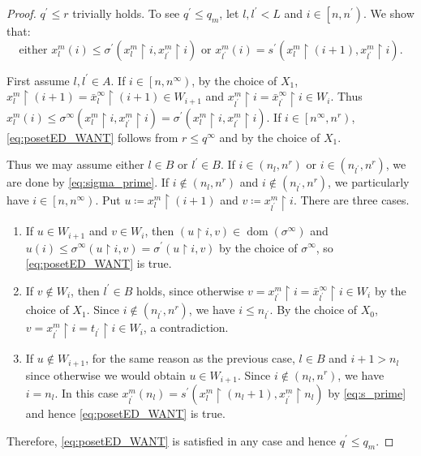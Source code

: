 \documentclass[a4paper,12pt]{amsart}
\theoremstyle{definition}
\numberwithin{thm}{section}
\numberwithin{equation}{section}
\newcommand{\on}{\mathpunct{\upharpoonright}}
\DeclareMathOperator{\dom}{dom}
\begin{document}
\begin{proof}
    	$q^\prime\leq r$ trivially holds.
    	To see $q^\prime\leq q_m$, let $l,l^\prime<L $ and $ i\in\left[n, n^\prime\right)$. 
    	We show that:
        \begin{equation}
            \label{eq:posetED_WANT}
            \text{either }x^m_l(i)\leq\sigma^\prime(x^m_l\on i, x^m_{l^\prime}\on i)\text{ or }
            x^m_{l^\prime}(i)= s^\prime(x^m_l\on(i+1),x^m_{l^\prime}\on i).
        \end{equation}
        
    	First assume $l,l^\prime\in A$. If $ i\in\left[n, n^\infty\right)$, by the choice of $X_1$, $x^m_l\on (i+1)=\bar{x}^\infty_l\on (i+1)\in W_{i+1}$ and $x^m _{l^\prime}\on  i=\bar{x}^\infty_{l^\prime}\on  i\in W_i$. Thus $x^m_l(i)\leq\sigma^\infty(x^m_l\on i, x^m_{l^\prime}\on i)=\sigma^\prime(x^m_l\on i, x^m_{l^\prime}\on i)$. If $ i\in\left[n^\infty, n^r\right)$, \eqref{eq:posetED_WANT} follows from $r\leq q^\infty$ and by the choice of $X_1$.
    
        Thus we may assume either $l\in B$ or $l^\prime\in B$. If $i\in\left(n_l,n^r\right)$ or $i\in\left(n_{l^\prime},n^r\right)$, we are done by \eqref{eq:sigma_prime}. 
    	If $i\notin\left(n_l,n^r\right)$ and $i\notin\left(n_{l^\prime},n^r\right)$, we particularly have $i\in \left[n, n^\infty\right)$.
    	Put $u\coloneqq x^m_l \on (i+1)$ and $v\coloneqq x^m_{l^\prime} \on i$. There are three cases.
        \begin{enumerate}[label = (\roman*)]
            \item
            If $u\in W_{i+1}$ and $v\in W_i$, then $(u\on i,v)\in\dom(\sigma^\infty)$ and $u(i)\leq\sigma^\infty(u\on i, v)=\sigma^\prime(u\on i, v)$ by the choice of $\sigma^\infty$, so \eqref{eq:posetED_WANT} is true.
    
            \item
            If $v\notin W_i$, then $l^\prime\in B$ holds, since otherwise $v=x^m _{l^\prime}\on  i=\bar{x}^\infty_{l^\prime}\on  i\in W_i$ by the choice of $X_1$. Since $i\notin\left(n_{l^\prime},n^r\right)$, we have $i\leq n_{l^\prime}$. By the choice of $X_0$, $v=x_{l^\prime}^m\on i=t_{l^\prime}\on i\in W_i$, a contradiction.
    
            \item
            If $u\notin W_{i+1}$, for the same reason as the previous case, $l\in B$ and $i+1>n_l$ since otherwise we would obtain $u\in W_{i+1}$. Since $i\notin\left(n_l,n^r\right)$, we have $i=n_l$. In this case $x^m_{l^\prime}(n_l)= s^\prime(x^m_l\on(n_l+1),x^m_{l^\prime}\on n_l)$ by \eqref{eq:s_prime} and hence \eqref{eq:posetED_WANT} is true.
        \end{enumerate}
        Therefore, \eqref{eq:posetED_WANT} is satisfied in any case and hence $q^\prime\leq q_m$.
    \end{proof}
    
\end{document}
